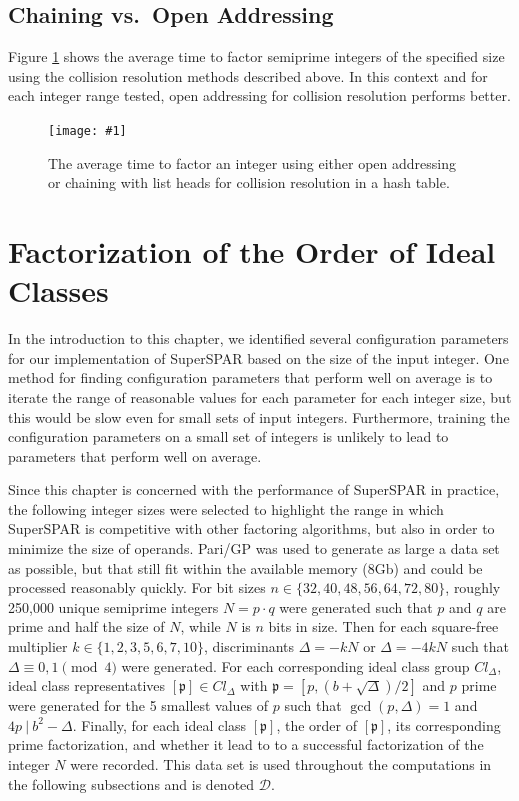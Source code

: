 \documentclass{ucalgthes1}
\theoremstyle{definition}
\newcommand{\set}{\mathcal}
\newcommand{\ideal}{\mathfrak}
\newcommand{\idealclass}[1]{\left[ \ideal #1 \right]}
\newcommand{\mygraphX}[4]{
	\begin{figure}[htb]
	\centering
	\texttt{[image: \#1]}
	\caption[#4]{#3}
	\label{#2}
	\end{figure}
}
\begin{document}
\subsection{Chaining vs.\ Open Addressing}

Figure \ref{fig:ssparHashing} shows the average time to factor semiprime integers of the specified size using the collision resolution methods described above.  In this context and for each integer range tested, open addressing for collision resolution performs better.

\mygraphX{hashing-open-vs-chained}{fig:ssparHashing}{The average time to factor an integer using either open addressing or chaining with list heads for collision resolution in a hash table.}{Open addressing vs Chaining.}

\section{Factorization of the Order of Ideal Classes}
\label{sec:ssparFactorizationOfTheOrder}

\newcommand{\idealDataSet}{\set D}

In the introduction to this chapter, we identified several configuration parameters for our implementation of SuperSPAR based on the size of the input integer.  One method for finding configuration parameters that perform well on average is to iterate the range of reasonable values for each parameter for each integer size, but this would be slow even for small sets of input integers.  Furthermore, training the configuration parameters on a small set of integers is unlikely to lead to parameters that perform well on average.  

Since this chapter is concerned with the performance of SuperSPAR in practice, the following integer sizes were selected to highlight the range in which SuperSPAR is competitive with other factoring algorithms, but also in order to minimize the size of operands.  Pari/GP was used to generate as large a data set as possible, but that still fit within the available memory (8Gb) and could be processed reasonably quickly.  For bit sizes $n \in \{32, 40, 48, 56, 64, 72, 80\}$, roughly 250,000 unique semiprime integers $N = p \cdot q$ were generated such that $p$ and $q$ are prime and half the size of $N$, while $N$ is $n$ bits in size.  Then for each square-free multiplier $k \in \{1, 2, 3, 5, 6, 7, 10\}$, discriminants $\Delta = -kN$ or $\Delta = -4kN$ such that $\Delta \equiv 0, 1 \pmod 4$ were generated.  For each corresponding ideal class group $Cl_\Delta$, ideal class representatives $\idealclass p \in Cl_\Delta$ with $\ideal p = [p, (b+\sqrt\Delta)/2]$ and $p$ prime were generated for the 5 smallest values of $p$ such that $\gcd(p, \Delta) = 1$ and $4p ~|~ b^2 - \Delta$.  Finally, for each ideal class $\idealclass p$, the order of $\idealclass p$, its corresponding prime factorization, and whether it lead to to a successful factorization of the integer $N$ were recorded.  This data set is used throughout the computations in the following subsections and is denoted $\idealDataSet$.
\end{document}
